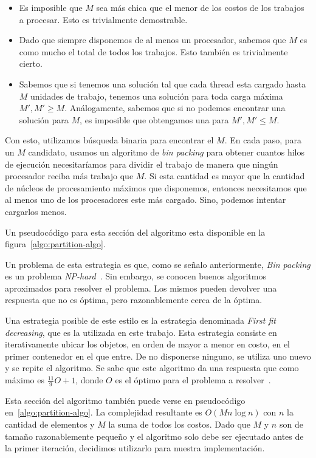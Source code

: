 \begin{itemize}
    \item Es imposible que $M$ sea m\'as chica que el menor de los costos de los
    trabajos a procesar. Esto es trivialmente demostrable.
    \item Dado que siempre disponemos de al menos un procesador, sabemos que $M$
    es como mucho el total de todos los trabajos. Esto tambi\'en es trivialmente
    cierto.
    \item Sabemos que si tenemos una soluci\'on tal que cada thread esta cargado
    hasta $M$ unidades de trabajo, tenemos una soluci\'on para toda carga m\'axima
    $M', M' \geq M$. An\'alogamente, sabemos que si no podemos encontrar una
    soluci\'on para $M$, es imposible que obtengamos una para $M', M' \leq M$.
\end{itemize}

Con esto, utilizamos b\'usqueda binaria para encontrar el $M$. En cada paso, para
un $M$ candidato, usamos un algoritmo de \textit{bin packing} para obtener
cuantos hilos de ejecuci\'on necesitar\'iamos para dividir el trabajo de manera que
ning\'un procesador reciba m\'as trabajo que $M$. Si esta cantidad es mayor que
la cantidad de n\'ucleos de procesamiento m\'aximos que disponemos, entonces
necesitamos que al menos uno de los procesadores este m\'as cargado. Sino, podemos
intentar cargarlos menos.

Un pseudoc\'odigo para esta secci\'on del algoritmo esta disponible en la figura~\ref{algo:partition-algo}.

Un problema de esta estrategia es que, como se se\~nalo anteriormente,
\textit{Bin packing} es un problema \textit{NP-hard}~\cite{NPCompleteness}. Sin
embargo, se conocen buenos algoritmos aproximados para resolver el problema. Los
mismos pueden devolver una respuesta que no es \'optima, pero razonablemente cerca
de la \'optima.

Una estrategia posible de este estilo es la estrategia denominada \textit{First
fit decreasing}, que es la utilizada en este trabajo. Esta estrategia consiste en
iterativamente ubicar los objetos, en orden de mayor a menor en costo,
en el primer contenedor en el que entre. De no disponerse ninguno, se utiliza
uno nuevo y se repite el algoritmo. Se sabe que este algoritmo da una respuesta
que como m\'aximo es $\frac{11}{9} O + 1$, donde $O$ es el \'optimo para el
problema a resolver~\cite{FFDDemo}.

Esta secci\'on del algoritmo tambi\'en puede verse en pseudoc\'odigo en~\ref{algo:partition-algo}.
La complejidad resultante es $O(M n \log n)$ con $n$ la cantidad de elementos y $M$ la suma
de todos los costos. Dado que $M$ y $n$ son de tama\~no razonablemente peque\~no y el algoritmo
solo debe ser ejecutado antes de la primer iteraci\'on, decidimos utilizarlo para
nuestra implementaci\'on.

